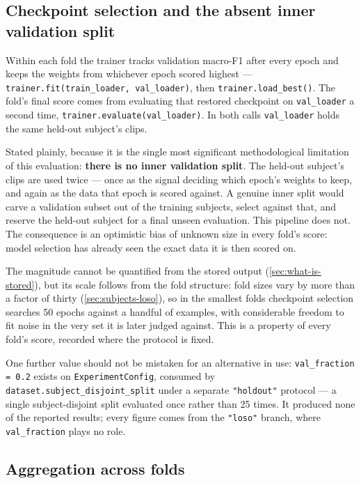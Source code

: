 \subsection{Checkpoint selection and the absent inner validation split}
\label{sec:checkpoint-selection}

Within each fold the trainer tracks validation macro-F1 after every epoch and keeps the weights from whichever epoch scored highest --- \verb|trainer.fit(train_loader, val_loader)|, then \verb|trainer.load_best()|. The fold's final score comes from evaluating that restored checkpoint on \texttt{val\_loader} a second time, \verb|trainer.evaluate(val_loader)|. In both calls \texttt{val\_loader} holds the same held-out subject's clips.

Stated plainly, because it is the single most significant methodological limitation of this evaluation: \textbf{there is no inner validation split}. The held-out subject's clips are used twice --- once as the signal deciding which epoch's weights to keep, and again as the data that epoch is scored against. A genuine inner split would carve a validation subset out of the training subjects, select against that, and reserve the held-out subject for a final unseen evaluation. This pipeline does not. The consequence is an optimistic bias of unknown size in every fold's score: model selection has already seen the exact data it is then scored on.

The magnitude cannot be quantified from the stored output (\autoref{sec:what-is-stored}), but its scale follows from the fold structure: fold sizes vary by more than a factor of thirty (\autoref{sec:subjects-loso}), so in the smallest folds checkpoint selection searches 50 epochs against a handful of examples, with considerable freedom to fit noise in the very set it is later judged against. This is a property of every fold's score, recorded where the protocol is fixed.

One further value should not be mistaken for an alternative in use: \texttt{val\_fraction = 0.2} exists on \texttt{ExperimentConfig}, consumed by \verb|dataset.subject_disjoint_split| under a separate \texttt{"holdout"} protocol --- a single subject-disjoint split evaluated once rather than 25 times. It produced none of the reported results; every figure comes from the \texttt{"loso"} branch, where \texttt{val\_fraction} plays no role.

\subsection{Aggregation across folds}
\label{sec:aggregation}

